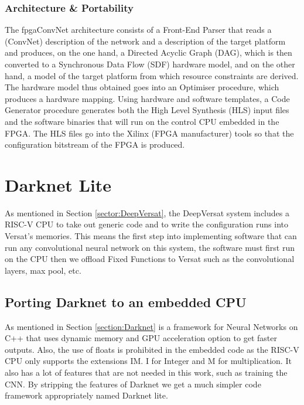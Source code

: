 \documentclass[conference]{IEEEtran}
\begin{document}
\subsubsection{Architecture \& Portability}


The fpgaConvNet architecture consists of a Front-End Parser that reads a (ConvNet) description of the network
and a description of the target platform and produces, on the one hand, a
Directed Acyclic Graph (DAG), which is then converted to a Synchronous Data Flow
(SDF) hardware model, and on the other hand, a model of the target platform from
which resource constraints are derived. The hardware model thus obtained goes
into an Optimiser procedure, which produces a hardware mapping. Using hardware
and software templates, a Code Generator procedure generates both the High
Level Synthesis (HLS) input files and the software binaries that will run on the
control CPU embedded in the FPGA. The HLS files go into the Xilinx (FPGA
manufacturer) tools so that the configuration bitstream of the FPGA is produced.






\section{Darknet Lite}
\label{chapter:Darknet}

As mentioned in Section \ref{sector:DeepVersat}, the DeepVersat system includes a RISC-V CPU to take out generic
code and to write the configuration runs into Versat's memories. This means the first step into implementing software
that can run any convolutional neural network on this system, the software must first run on the CPU then we offload Fixed Functions 
to Versat such as the convolutional layers, max pool, etc.

\subsection{Porting Darknet to an embedded CPU}

As mentioned in Section \ref{section:Darknet} is a framework for Neural Networks on C++ that uses dynamic memory 
and GPU acceleration option to get faster outputs.
Also, the use of floats is prohibited in the embedded code
as the RISC-V CPU only supports the extensions IM. I for Integer and M for multiplication.
It also has a lot of features that are not needed in this work, such as training the CNN.
By stripping the features of Darknet we get a much simpler
code framework appropriately named Darknet lite.
\end{document}
